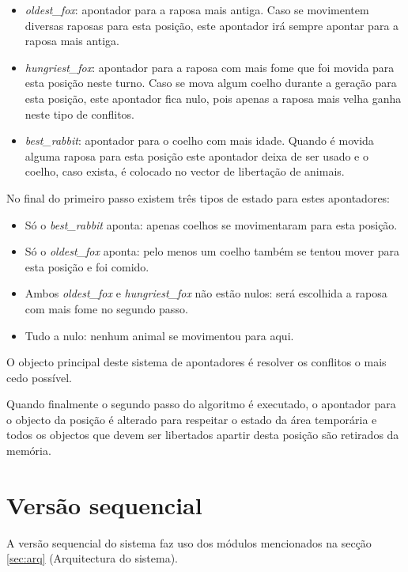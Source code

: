 \documentclass[12pt]{article}
\begin{document}
\begin{itemize}
  \item \textit{oldest\_fox}: apontador para a raposa mais antiga. Caso se movimentem diversas raposas para esta
    posição, este apontador irá sempre apontar para a raposa mais antiga.
  \item \textit{hungriest\_fox}: apontador para a raposa com mais fome que foi movida para esta posição neste turno.
  Caso se mova algum coelho durante a geração para esta posição, este apontador fica nulo, pois apenas a raposa mais
  velha ganha neste tipo de conflitos.
  \item \textit{best\_rabbit}: apontador para o coelho com mais idade. Quando é movida alguma raposa para
  esta posição este apontador deixa de ser usado e o coelho, caso exista, é colocado no vector de libertação de animais.
\end{itemize}

No final do primeiro passo existem três tipos de estado para estes apontadores:

\begin{itemize}
  \item Só o \textit{best\_rabbit} aponta: apenas coelhos se movimentaram para esta posição.
  \item Só o \textit{oldest\_fox} aponta: pelo menos um coelho também se tentou mover para esta posição e foi comido.
  \item Ambos \textit{oldest\_fox} e \textit{hungriest\_fox} não estão nulos: será escolhida a raposa com mais fome no segundo passo.
  \item Tudo a nulo: nenhum animal se movimentou para aqui.
\end{itemize}

O objecto principal deste sistema de apontadores é resolver os conflitos o mais cedo possível.

Quando finalmente o segundo passo do algoritmo é executado, o apontador para o objecto da posição é alterado
para respeitar o estado da área temporária e todos os objectos que devem ser libertados apartir desta posição são retirados da memória.

\section{Versão sequencial}

A versão sequencial do sistema faz uso dos módulos mencionados na secção \ref{sec:arq} (Arquitectura do sistema).
\end{document}
